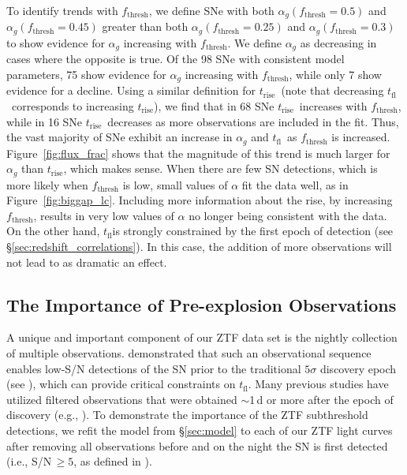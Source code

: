 \documentclass[twocolumn]{./aastex63}
\newcommand{\tfl}{$t_\mathrm{fl}$}
\newcommand{\trise}{$t_\mathrm{rise}$}
\begin{document}
To identify trends with $f_\mathrm{thresh}$, we define SNe with both
$\alpha_g(f_\mathrm{thresh} = 0.5)$ and $\alpha_g(f_\mathrm{thresh} = 0.45)$
greater than both $\alpha_g(f_\mathrm{thresh} = 0.25)$ and
$\alpha_g(f_\mathrm{thresh} = 0.3)$ to show evidence for $\alpha_g$ increasing
with $f_\mathrm{thresh}$. We define $\alpha_g$ as decreasing in cases where
the opposite is true. Of the 98 SNe with consistent model parameters, 75 show
evidence for $\alpha_g$ increasing with $f_\mathrm{thresh}$, while only 7 show
evidence for a decline. Using a similar definition for \trise\ (note that
decreasing \tfl\ corresponds to increasing \trise), we find that in 68 SNe
\trise\ increases with $f_\mathrm{thresh}$, while in 16 SNe \trise\ decreases
as more observations are included in the fit. Thus, the vast majority of SNe
exhibit an increase in $\alpha_g$ and \tfl\ as $f_\mathrm{thresh}$ is
increased. Figure~\ref{fig:flux_frac} shows that the magnitude of this trend
is much larger for $\alpha_g$ than \trise, which makes sense. When there are
few SN detections, which is more likely when $f_\mathrm{thresh}$ is low, small
values of $\alpha$ fit the data well, as in Figure~\ref{fig:biggap_lc}.
Including more information about the rise, by increasing $f_\mathrm{thresh}$,
results in very low values of $\alpha$ no longer being consistent with the
data. On the other hand, \tfl is strongly constrained by the first epoch of
detection (see \S\ref{sec:redshift_correlations}). In this case, the addition
of more observations will not lead to as dramatic an effect.

\subsection{The Importance of Pre-explosion Observations}\label{sec:pre_explosion}

A unique and important component of our ZTF data set is the nightly collection
of multiple observations. \citet{Yao19} demonstrated that such an
observational sequence enables low-S/N detections of the SN prior to the
traditional $5\sigma$ discovery epoch (see \citealt{Masci19}), which can
provide critical constraints on \tfl. Many previous studies have utilized
filtered observations that were obtained $\sim$1\,d or more after the epoch of
discovery (e.g., \citealt{Riess99a,Aldering00,Ganeshalingam11,Zheng17a}). To
demonstrate the importance of the ZTF subthreshold detections, we refit the
model from \S\ref{sec:model} to each of our ZTF light curves after removing
all observations before and on the night the SN is first detected (i.e.,
S/N\,$\geq 5$, as defined in \citet{Yao19}).
\end{document}
